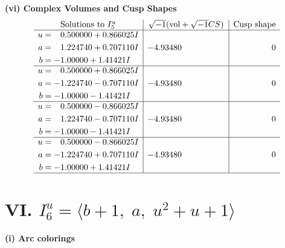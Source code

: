 \documentclass[1p]{elsarticle_modified}
\theoremstyle{definition}
\newcommand{\I}{\sqrt{-1}}
\begin{document}
\newpage\flushleft \textbf{(vi) Complex Volumes and Cusp Shapes}
$$\begin{array}{c|c|c}  
\text{Solutions to }I^u_{5}& \I (\text{vol} + \sqrt{-1}CS) & \text{Cusp shape}\\
 \hline 
\begin{aligned}
u &= \phantom{-}0.500000 + 0.866025 I \\
a &= \phantom{-}1.224740 + 0.707110 I \\
b &= -1.00000 + 1.41421 I\end{aligned}
 & -4.93480\phantom{ +0.000000I} & \phantom{-0.000000 } 0 \\ \hline\begin{aligned}
u &= \phantom{-}0.500000 + 0.866025 I \\
a &= -1.224740 - 0.707110 I \\
b &= -1.00000 - 1.41421 I\end{aligned}
 & -4.93480\phantom{ +0.000000I} & \phantom{-0.000000 } 0 \\ \hline\begin{aligned}
u &= \phantom{-}0.500000 - 0.866025 I \\
a &= \phantom{-}1.224740 - 0.707110 I \\
b &= -1.00000 - 1.41421 I\end{aligned}
 & -4.93480\phantom{ +0.000000I} & \phantom{-0.000000 } 0 \\ \hline\begin{aligned}
u &= \phantom{-}0.500000 - 0.866025 I \\
a &= -1.224740 + 0.707110 I \\
b &= -1.00000 + 1.41421 I\end{aligned}
 & -4.93480\phantom{ +0.000000I} & \phantom{-0.000000 } 0\\
 \hline 
 \end{array}$$\newpage\newpage\renewcommand{\arraystretch}{1}
\centering \section*{VI. $I^u_{6}= \langle b+1,\;a,\;u^2+u+1 \rangle$}
\flushleft \textbf{(i) Arc colorings}\\
\end{document}
